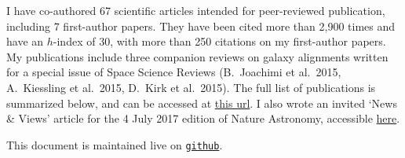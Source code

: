 I have co-authored 67 scientific articles intended for peer-reviewed publication,
including 7 first-author papers. They have been cited more than 2,900 times and
have an $h$-index of 30, with more than 250 citations on my first-author papers.
My publications include three companion reviews on galaxy alignments written for a
special issue of Space Science Reviews (B.\ Joachimi et al.\ 2015, A.\ Kiessling
et al.\ 2015, D.\ Kirk et al.\ 2015). The full list of publications is summarized
below, and can be accessed at \href{https://goo.gl/LAu9G4}{this url}. I also wrote
an invited `News \& Views' article for the 4 July 2017 edition of Nature
Astronomy, accessible
\href{https://www.nature.com/articles/s41550-017-0181}{here}.

This document is maintained live on
\href{https://github.com/cristobal-sifon/cv/blob/master/Sifon_publications.pdf}{\texttt{github}}.

